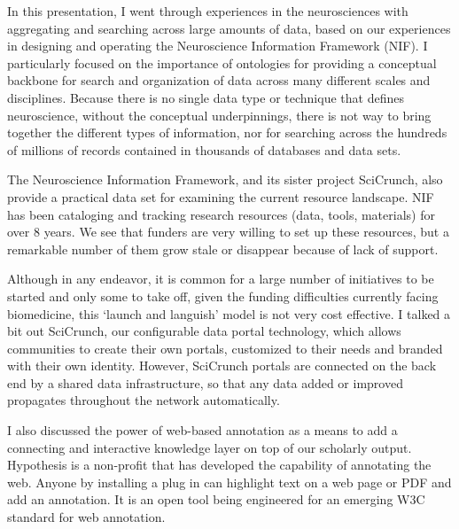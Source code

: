 \documentclass[a4paper,USenglish]{dagrep}
\begin{document}
{}
\license
In this presentation, I went through experiences in the neurosciences with
aggregating and searching across large amounts of data, based on our experiences
in designing and operating the Neuroscience Information Framework (NIF).  I
particularly focused on the importance of ontologies for providing a conceptual
backbone for search and organization of data across many different scales and
disciplines.  Because there is no single data type or technique that defines
neuroscience, without the conceptual underpinnings, there is not way to bring
together the different types of information, nor for searching across the
hundreds of millions of records contained in thousands of databases and data sets.  

The Neuroscience Information Framework, and its sister project SciCrunch, also
provide a practical data set for examining the current resource landscape.  NIF
has been cataloging and tracking research resources (data, tools, materials) for
over 8 years.  We see that funders are very willing to set up these resources,
but a remarkable number of them grow stale or disappear because of lack of
support.  

Although in any endeavor, it is common for a large number of initiatives to be
started and only some to take off, given the funding difficulties currently
facing biomedicine, this `launch and languish' model is not very cost effective.
 I talked a bit out SciCrunch, our configurable data portal technology, which
allows communities to create their own portals, customized to their needs and
branded with their own identity.  However, SciCrunch portals are connected on
the back end by a shared data infrastructure, so that any data added or improved
propagates throughout the network automatically.

I also discussed the power of web-based annotation as a means to add a
connecting and interactive knowledge layer on top of our scholarly output. 
Hypothesis is a non-profit that has developed the capability of annotating the
web.  Anyone by installing a plug in can highlight text on a web page or PDF and
add an annotation.  It is an open tool being engineered for an emerging W3C
standard for web annotation.
\end{document}
